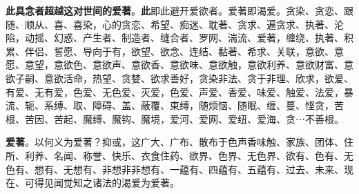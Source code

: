 \textbf{此具念者超越这对世间的爱著}。\textbf{此}即此避开爱欲者。爱著即渴爱。贪染、贪恋、跟随、顺从、喜、喜染，心的贪恋、希望、痴迷、耽著、贪求、遍贪求、执著、沦陷，动摇、幻惑、产生者、制造者、缝合者、罗网、湍流、爱著，缠绕、执著、积累、伴侣、誓愿、导向于有，欲望、欲念、连结、黏著、希求、关联，意欲、意愿、意望，意欲色、意欲声、意欲香、意欲味、意欲触，意欲利养、意欲财富、意欲子嗣、意欲活命，热望、贪婪、欲求善好，贪染非法、贪于非理、欣求，欲爱、有爱、无有爱，色爱、无色爱、灭爱，色爱、声爱、香爱、味爱、触爱、法爱，暴流、轭、系缚、取、障碍、盖、蔽覆、束缚，随烦恼、随眠、缠、蔓、悭贪，苦根、苦因、苦起、魔缚、魔钩、魔境，爱河、爱网、爱纽、爱海、贪⋯不善根。


\textbf{爱著}。以何义为爱著？抑或，这广大、广布、散布于色声香味触、家族、团体、住所、利养、名闻、称誉、快乐、衣食住药、欲界、色界、无色界、欲有、色有、无色有、想有、无想有、非想非非想有、一蕴有、四蕴有、五蕴有、过去、未来、现在、可得见闻觉知之诸法的渴爱为爱著。


